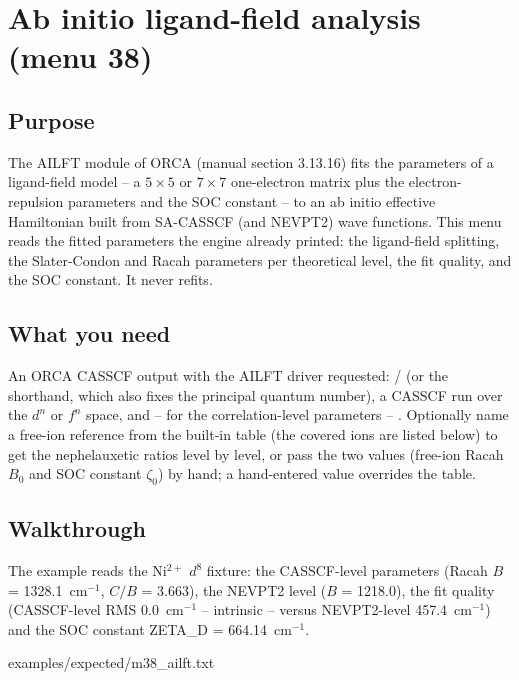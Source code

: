 \chapter{Ab initio ligand-field analysis (menu 38)}
\label{ch:menu38}

\section{Purpose}

The AILFT module of ORCA (manual section 3.13.16) fits the parameters of a
ligand-field model -- a $5\times5$ or $7\times7$ one-electron matrix plus
the electron-repulsion parameters and the SOC constant -- to an ab initio
effective Hamiltonian built from SA-CASSCF (and NEVPT2) wave functions.
This menu reads the fitted parameters the engine already printed: the
ligand-field splitting, the Slater-Condon and Racah parameters per
theoretical level, the fit quality, and the SOC constant.  It never
refits.

\section{What you need}

An ORCA CASSCF output with the AILFT driver requested: / (or the  shorthand, which also fixes the
principal quantum number), a CASSCF run over the $d^n$ or $f^n$ space, and
-- for the correlation-level parameters -- .  Optionally
name a free-ion reference from the built-in table (the covered ions are
listed below) to get the nephelauxetic ratios level by level, or pass the
two values (free-ion Racah $B_0$ and SOC constant $\zeta_0$) by hand; a
hand-entered value overrides the table.

\section{Walkthrough}

The example reads the Ni$^{2+}$ $d^8$ fixture: the CASSCF-level parameters
(Racah $B$ = 1328.1~cm$^{-1}$, $C/B$ = 3.663), the NEVPT2 level
($B$ = 1218.0), the fit quality (CASSCF-level RMS 0.0~cm$^{-1}$ -- intrinsic
-- versus NEVPT2-level 457.4~cm$^{-1}$) and the SOC constant
ZETA\_D = 664.14~cm$^{-1}$.


  {examples/expected/m38_ailft.txt}

